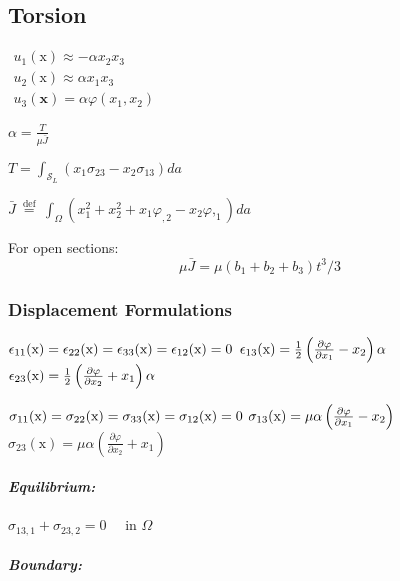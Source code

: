 \hypertarget{torsion}{%
\subsection{Torsion}\label{torsion}}

\(\begin{array}{l}{u_{1}(\mathrm{x})\approx-\alpha x_{2} x_{3}} \\ {u_{2}(\mathrm{x})\approx\alpha x_{1} x_{3}} \\ u_{3}(\mathbf{x})=\alpha \varphi\left(x_{1}, x_{2}\right)\end{array}\)

\(\alpha=\frac{T}{\mu \bar{J}}\)

\(T=\int_{\mathcal{S}_{L}}\left(x_{1} \sigma_{23}-x_{2} \sigma_{13}\right) d a\)

\(\bar{J} \stackrel{\text { def }}{=} \int_{\Omega}\left(x_{1}^{2}+x_{2}^{2}+x_{1} \varphi_{, 2}-x_{2} \varphi,_{1}\right) d a\)

For open sections: \[
\mu \bar{J} =\mu\left(b_{1}+b_{2}+b_{3}\right) t^{3} / 3
\]

\hypertarget{displacement-formulations}{%
\subsubsection{Displacement
Formulations}\label{displacement-formulations}}

\({\epsilon_{11}(\mathrm{x})=\epsilon_{22}(\mathrm{x})=\epsilon_{33}(\mathrm{x})=\epsilon_{12}(\mathrm{x})=0}\\\)
\(\epsilon_{13}(\mathrm{x})=\frac{1}{2}\left(\frac{\partial \varphi}{\partial x_{1}}-x_{2}\right) \alpha\\\)
\(\epsilon_{23}(\mathrm{x})=\frac{1}{2}\left(\frac{\partial \varphi}{\partial x_{2}}+x_{1}\right) \alpha\\\)

\(\sigma_{11}(\mathrm{x})=\sigma_{22}(\mathrm{x})=\sigma_{33}(\mathrm{x})=\sigma_{12}(\mathrm{x})=0 \\\)
\(\sigma_{13}(\mathrm{x})=\mu \alpha\left(\frac{\partial \varphi}{\partial x_{1}}-x_{2}\right)\\\)
\(\sigma_{23}(\mathrm{x})=\mu \alpha\left(\frac{\partial \varphi}{\partial x_{2}}+x_{1}\right)\)

\hypertarget{equilibrium}{%
\subparagraph{Equilibrium:}\label{equilibrium}}

\(\sigma_{13,1}+\sigma_{23,2}=0 \quad \text { in } \Omega\)

\hypertarget{boundary-1}{%
\subparagraph{Boundary:}\label{boundary-1}}

